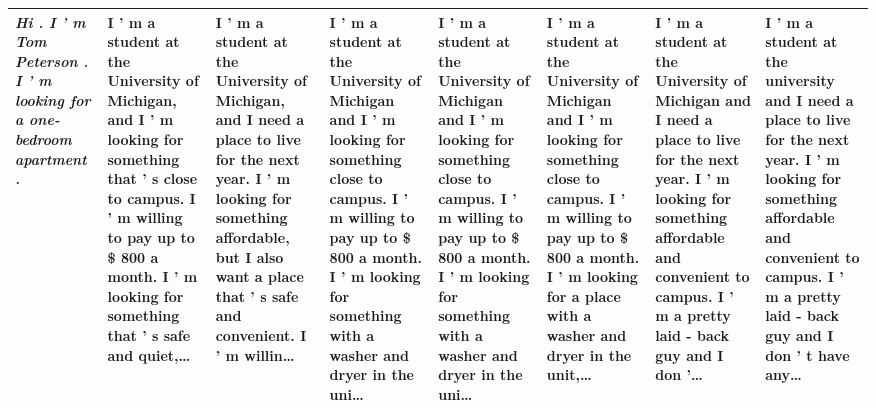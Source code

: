 \begin{table}[t]
\begin{tabularx}{\textwidth}{p{} X X X X X X X}
\textit{Hi . I ’ m Tom Peterson . I ’ m looking for a one-bedroom apartment .} & I ’ m a student at the University of Michigan, and I ’ m looking for something that ’ s close to campus. I ’ m willing to pay up to \$ 800 a month. I ’ m looking for something that ’ s safe and quiet,… & I ’ m a student at the University of Michigan, and I need a place to live for the next year. I ’ m looking for something affordable, but I also want a place that ’ s safe and convenient. I ’ m willin… & I ’ m a student at the University of Michigan and I ’ m looking for something close to campus. I ’ m willing to pay up to \$ 800 a month. I ’ m looking for something with a washer and dryer in the uni… & I ’ m a student at the University of Michigan and I ’ m looking for something close to campus. I ’ m willing to pay up to \$ 800 a month. I ’ m looking for something with a washer and dryer in the uni… & I ’ m a student at the University of Michigan and I ’ m looking for something close to campus. I ’ m willing to pay up to \$ 800 a month. I ’ m looking for a place with a washer and dryer in the unit,… & I ’ m a student at the University of Michigan and I need a place to live for the next year. I ’ m looking for something affordable and convenient to campus. I ’ m a pretty laid - back guy and I don ’… & I ’ m a student at the university and I need a place to live for the next year. I ’ m looking for something affordable and convenient to campus. I ’ m a pretty laid - back guy and I don ’ t have any… \\
\bottomrule
\end{tabularx}
\end{table}
